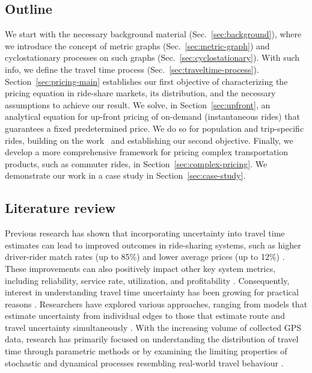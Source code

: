\documentclass[12pt]{article}
\begin{document}
\subsection{Outline}
We start with the necessary background material (Sec.~\ref{sec:background}), where we introduce the concept of metric graphs (Sec.~\ref{sec:metric-graph}) and cyclostationary processes on such graphs (Sec.~\ref{sec:cyclostationary}). With such info, we define the travel time process (Sec.~\ref{sec:traveltime-process}). Section~\ref{sec:pricing-main} establishes our first objective of characterizing the pricing equation in ride-share markets, its distribution, and the necessary assumptions to achieve our result. We solve, in Section~\ref{sec:upfront}, an analytical equation for up-front pricing of on-demand (instantaneous rides) that guarantees a fixed predetermined price. We do so for population and trip-specific rides, building on the work~\cite{elmasri2020predictive, woodard2017predicting} and establishing our second objective. Finally, we develop a more comprehensive framework for pricing complex transportation products, such as commuter rides, in Section~\ref{sec:complex-pricing}. We demonstrate our work in a case study in Section~\ref{sec:case-study}.

\subsection{Literature review}
\label{literature}
Previous research has shown that incorporating uncertainty into travel time estimates can lead to improved outcomes in ride-sharing systems, such as higher driver-rider match rates (up to 85\%) and lower average prices (up to 12\%) \citep{long2018ride}. These improvements can also positively impact other key system metrics, including reliability, service rate, utilization, and profitability \citep{li2021vehicle, li2022pricing,li2022ride}. Consequently, interest in understanding travel time uncertainty has been growing for practical reasons \citep{westgate2013travel,wang2019simple, hunter2009path,westgate2016large}.  Researchers have explored various approaches, ranging from models that estimate uncertainty from individual edges \citep{zheng2013urban,jenelius2013travel} to those that estimate route and travel uncertainty simultaneously \citep{westgate2013travel,wang2019simple, hunter2009path,westgate2016large}. With the increasing volume of collected GPS data, research has primarily focused on understanding the distribution of travel time through parametric methods \citep{woodard2017predicting,guo2012multistate,ma2017estimation,zhang2019novel} or by examining the limiting properties of stochastic and dynamical processes resembling real-world travel behaviour \cite{elmasri2020predictive, bolin2022gaussian}.
\end{document}

